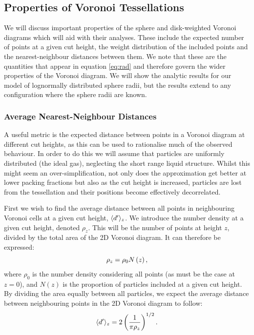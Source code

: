 \subsection{Properties of Voronoi Tessellations}

We will discuss important properties of the sphere and disk\--weighted Voronoi diagrams which will aid with their analyses.
These include the expected number of points at a given cut height, the weight distribution of the included points and the nearest\--neighbour distances between them.
We note that these are the quantities that appear in equation \eqref{eq:rad} and therefore govern the wider properties of the Voronoi diagram. 
We will show the analytic results for our model of lognormally distributed sphere radii, but the results extend to any configuration where the sphere radii are known.

\subsubsection{Average Nearest\--Neighbour Distances}

A useful metric is the expected distance between points in a Voronoi diagram at different cut heights, as this can be used to rationalise much of the observed behaviour.
In order to do this we will assume that particles are uniformly distributed (the ideal gas), neglecting the short range liquid structure.
Whilst this might seem an over\--simplification, not only does the approximation get better at lower packing fractions but also as the cut height is increased, particles are lost from the tessellation and their positions become effectively decorrelated. 

First we wish to find the average distance between all points in neighbouring Voronoi cells at a given cut height, $\langle d^\prime \rangle_z$.
We introduce the number density at a given cut height, denoted $\rho_z$. 
This will be the number of points at height $z$, divided by the total area of the 2D Voronoi diagram.
It can therefore be expressed:
\begin{equation}
	\label{eq:numden}
	\rho_z = \rho_0 N\left(z\right),
\end{equation}
where $\rho_0$ is the number density considering all points (as must be the case at $z=0$), and $N\left(z\right)$ is the proportion of particles included at a given cut height.
By dividing the area equally between all particles, we expect the average distance between neighbouring points in the 2D Voronoi diagram to follow:
\begin{equation}
	\label{eq:ndist}
	\ed = 2\left(\frac{1}{\pi\rho_z}\right)^{1/2}.%
\end{equation}

